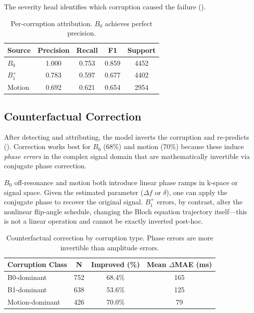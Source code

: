\documentclass[11pt,a4paper]{article}
\begin{document}
The severity head identifies which corruption caused the failure ().

\begin{table}[H]
  \centering
  \caption{Per-corruption attribution. $B_0$ achieves perfect precision.}
  \label{tab:attribution}
  \begin{tabular}{@{}lcccc@{}}
    \toprule
    \textbf{Source} & \textbf{Precision} & \textbf{Recall} & \textbf{F1} & \textbf{Support} \\
    \midrule
    $B_0$ & 1.000 & 0.753 & 0.859 & 4452 \\
    $B_1^+$ & 0.783 & 0.597 & 0.677 & 4402 \\
    Motion & 0.692 & 0.621 & 0.654 & 2954 \\
    \bottomrule
  \end{tabular}
\end{table}

\subsection{Counterfactual Correction}

After detecting and attributing, the model inverts the corruption and re-predicts (). Correction works best for $B_0$ (68\%) and motion (70\%) because these induce \emph{phase errors} in the complex signal domain that are mathematically invertible via conjugate phase correction.

\begin{intuition}
$B_0$ off-resonance and motion both introduce linear phase ramps in k-space or signal space. Given the estimated parameter ($\Delta f$ or $\delta$), one can apply the conjugate phase to recover the original signal. $B_1^+$ errors, by contrast, alter the nonlinear flip-angle schedule, changing the Bloch equation trajectory itself---this is not a linear operation and cannot be exactly inverted post-hoc.
\end{intuition}

\begin{table}[H]
  \centering
  \caption{Counterfactual correction by corruption type. Phase errors are more invertible than amplitude errors.}
  \label{tab:counterfactual}
  \begin{tabular}{@{}lccc@{}}
    \toprule
    \textbf{Corruption Class} & \textbf{N} & \textbf{Improved (\%)} & \textbf{Mean $\Delta$MAE (ms)} \\
    \midrule
    B0-dominant     & 752 & 68.4\% & 165 \\
    B1-dominant     & 638 & 53.6\% & 125 \\
    Motion-dominant & 426 & 70.0\% & 79  \\
    \bottomrule
  \end{tabular}
\end{table}
\end{document}
